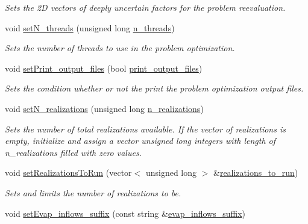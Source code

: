 \begin{DoxyCompactItemize}
\begin{DoxyCompactList}\small\item\em Sets the 2D vectors of deeply uncertain factors for the problem reevaluation. \end{DoxyCompactList}\item 
void \mbox{\hyperlink{classProblem_ad770920d19d5276fd0e30b835abe21ef}{set\+N\+\_\+threads}} (unsigned long \mbox{\hyperlink{classProblem_a3303a162d648e8ae16153b57b5b4054f}{n\+\_\+threads}})
\begin{DoxyCompactList}\small\item\em Sets the number of threads to use in the problem optimization. \end{DoxyCompactList}\item 
void \mbox{\hyperlink{classProblem_a1f055d5e57392700cab27efdd4577be9}{set\+Print\+\_\+output\+\_\+files}} (bool \mbox{\hyperlink{classProblem_a3372a73270ce989f5d2056cace66215b}{print\+\_\+output\+\_\+files}})
\begin{DoxyCompactList}\small\item\em Sets the condition whether or not the print the problem optimization output files. \end{DoxyCompactList}\item 
void \mbox{\hyperlink{classProblem_ae5cec2ad575abb95cf7304153c31e410}{set\+N\+\_\+realizations}} (unsigned long \mbox{\hyperlink{classProblem_a270a5672643bfe09e52e0f24e1884136}{n\+\_\+realizations}})
\begin{DoxyCompactList}\small\item\em Sets the number of total realizations available. If the vector of realizations is empty, initialize and assign a vector unsigned long integers with length of n\+\_\+realizations filled with zero values. \end{DoxyCompactList}\item 
void \mbox{\hyperlink{classProblem_afe5ddeb70b303e4971251e92a10f4828}{set\+Realizations\+To\+Run}} (vector$<$ unsigned long $>$ \&\mbox{\hyperlink{classProblem_af9ed9265d0d2b4918bd468d717429de1}{realizations\+\_\+to\+\_\+run}})
\begin{DoxyCompactList}\small\item\em Sets and limits the number of realizations to be. \end{DoxyCompactList}\item 
void \mbox{\hyperlink{classProblem_afb5e51664d0f340c393f7583622e99ca}{set\+Evap\+\_\+inflows\+\_\+suffix}} (const string \&\mbox{\hyperlink{classProblem_a1ff3958eef8bfb851a84ce0772104dca}{evap\+\_\+inflows\+\_\+suffix}})

\end{DoxyCompactItemize}
